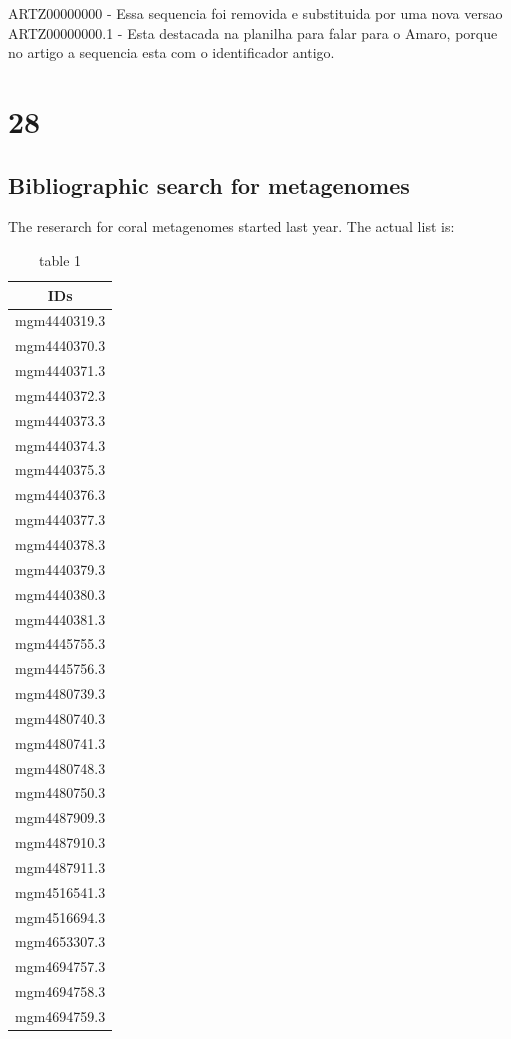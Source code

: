 \documentclass[12pt, a4paper]{report}
\begin{document}
ARTZ00000000 - Essa sequencia foi removida e substituida por uma nova versao ARTZ00000000.1 - Esta destacada na planilha para falar para o Amaro, porque no artigo a sequencia esta com o identificador antigo.

\section{28}

\subsection{Bibliographic search for metagenomes}
The reserarch for coral metagenomes started last year. The actual list is:

\begin{center}
\begin{longtable}{c}
\caption{table 1}\\
\hline
  IDs\\
\hline
mgm4440319.3\\
mgm4440370.3\\
mgm4440371.3\\
mgm4440372.3\\
mgm4440373.3\\
mgm4440374.3\\
mgm4440375.3\\
mgm4440376.3\\
mgm4440377.3\\
mgm4440378.3\\
mgm4440379.3\\
mgm4440380.3\\
mgm4440381.3\\
mgm4445755.3\\
mgm4445756.3\\
mgm4480739.3\\
mgm4480740.3\\
mgm4480741.3\\
mgm4480748.3\\
mgm4480750.3\\
mgm4487909.3\\
mgm4487910.3\\
mgm4487911.3\\
mgm4516541.3\\
mgm4516694.3\\
mgm4653307.3\\
mgm4694757.3\\
mgm4694758.3\\
mgm4694759.3\\

\end{longtable}
\end{center}
\end{document}
